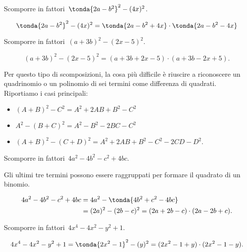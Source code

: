 \begin{esempio}{}{}
Scomporre in fattori~\(\tonda{2a-b^{2}}^{2}-(4x)^{2}\).

\vspace{-1.0em}
\[\tonda{2a-b^{2}}^{2}-(4x)^{2}=
\tonda{2a-b^{2}+4x}\cdot \tonda{2a-b^{2}-4x}\]
\end{esempio}

\begin{esempio}{}{}
Scomporre in fattori~\((a+3b)^{2}-(2x-5)^{2}\).

\vspace{-1.0em}
\[(a+3b)^{2}-(2x-5)^{2}=(a+3b+2x-5)\cdot (a+3b-2x+5).\]
\end{esempio}

Per questo tipo di scomposizioni, la cosa più difficile è riuscire a 
riconoscere un quadrinomio o un polinomio di sei termini come differenza 
di quadrati. Riportiamo i casi principali:
\begin{itemize}[nosep]
\item \((A+B)^{2}-C^{2}=A^{{2}}+2AB+B^{2}-C^{2}\)
\item \(A^{2}-(B+C)^{2}=A^{2}-B^{2}-2BC-C^{2}\)
\item \((A+B)^{2}-(C+D)^{2}=A^{2}+2AB+B^{2}-C^{2}-2CD-D^{2}\).
\end{itemize}

\begin{esempio}{}{}
Scomporre in fattori~\(4a^{2}-4b^{2}-c^{2}+4bc\).

Gli ultimi tre termini possono essere raggruppati per formare il quadrato di 
un binomio.

\vspace{-2.0em}
\begin{equation*}
  \begin{split}
    4a^{2}-4b^{2}-c^{2}+4bc &=4a^{2}-\tonda{4b^{2}+c^{2}-4bc} \\
                &= (2a)^{2}-(2b-c)^{2}=(2a+2b-c)\cdot (2a-2b+c).
  \end{split}
\end{equation*}
\end{esempio}

\begin{esempio}{}{}
Scomporre in fattori~\(4x^4-4x^2-y^{2}+1\).

\vspace{-2.0em}
\[4x^4-4x^2-y^{2}+1=\tonda{2x^2-1}^{2}-(y)^{2}=(2x^2-1+y)\cdot 
(2x^2-1-y).\]
\end{esempio}

